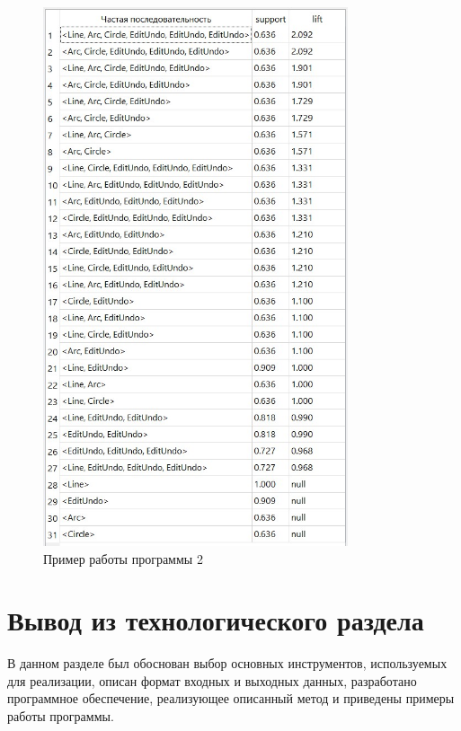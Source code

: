 \newpage
\begin{figure}[h!]
	\centering
	\includegraphics[width=0.8\textwidth]{inc/img/example2.jpg}
	\caption{Пример работы программы 2}
	\label{example2}
\end{figure}

\newpage
\section*{Вывод из технологического раздела}
В данном разделе был обоснован выбор основных инструментов, используемых для реализации, описан формат входных и выходных данных, разработано программное обеспечение, реализующее описанный метод и приведены примеры работы программы.